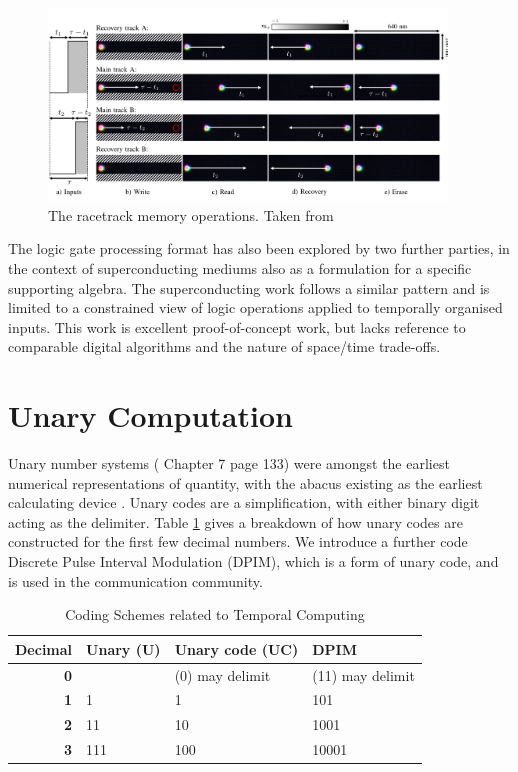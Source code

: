 \documentclass{article}
\begin{document}
\begin{figure}[ht]
	\centering
	\includegraphics[width=300pt]{figures/racetrack.png}
	\caption{The racetrack memory operations. Taken from \cite{vakili2020temporal}}
	\label{fig:racetrack}
\end{figure}

The logic gate processing format has also been explored by two further parties, in the context of superconducting mediums \cite{tzimpragos2019arbitrary} \cite{tzimpragos2021temporal} \cite{tzimpragos2022computing} \cite{volk2023addressable} \cite{segal2022digital} also as a formulation for a specific supporting algebra. The superconducting work follows a similar pattern and is limited to a constrained view of logic operations applied to temporally organised inputs. This work is excellent proof-of-concept work, but lacks reference to comparable digital algorithms and the nature of space/time trade-offs.

\section{Unary Computation} \label{unary}

Unary number systems (\cite{MacKay:2002:ITI:971143} Chapter 7 page 133) were amongst the earliest numerical representations of quantity, with the abacus existing as the earliest calculating device \cite{POPPELBAUM198747}. Unary codes are a simplification, with either binary digit acting as the delimiter. Table \ref{mem1} gives a breakdown of how unary codes are constructed for the first few decimal numbers. We introduce a further code Discrete Pulse Interval Modulation (DPIM), which is a form of unary code, and is used in the communication community.

\begin{table}[ht]
	\begin{center}
		\begin{tabular}{rlll} \hline
			\textbf{Decimal} & Unary (U) & Unary code (UC) & DPIM             \\\hline
			\textbf{0}       &           & (0) may delimit & (11) may delimit \\
			\textbf{1}       & 1         & 1               & 101              \\
			\textbf{2}       & 11        & 10              & 1001             \\
			\textbf{3}       & 111       & 100             & 10001            \\ \hline
		\end{tabular}
	\end{center}
	\caption{Coding Schemes related to Temporal Computing}\label{mem1}
\end{table}
\end{document}
